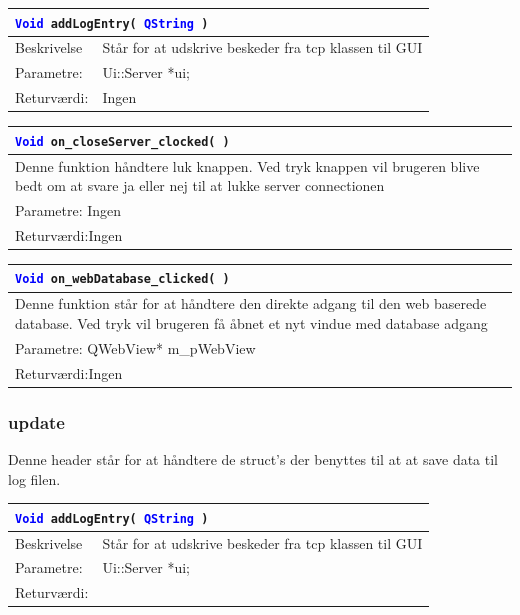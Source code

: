 \begin{table}[H]
\begin{tabular}{l p{12.5cm}}
\multicolumn{2}{l}{\texttt{\textcolor{blue}{Void} addLogEntry( \textcolor{blue}{QString} )}} \\
\hline
Beskrivelse & Står for at udskrive beskeder fra tcp klassen til GUI \\
Parametre: & Ui::Server *ui;\\
Returværdi:& Ingen\\
\end{tabular}
\end{table}

\begin{table}[H]
\begin{tabular}{l p{12.5cm}}
\multicolumn{2}{l}{\texttt{\textcolor{blue}{Void} on\_closeServer\_clocked( )}} \\
\hline
Denne funktion håndtere luk knappen. Ved tryk knappen vil brugeren blive bedt om at svare ja eller nej til at lukke server connectionen \\
Parametre: Ingen\\
Returværdi:Ingen\\
\end{tabular}
\end{table}

\begin{table}[H]
\begin{tabular}{l p{12.5cm}}
\multicolumn{2}{l}{\texttt{\textcolor{blue}{Void} on\_webDatabase\_clicked( )}} \\
\hline
Denne funktion står for at håndtere den direkte adgang til den web baserede database. Ved tryk vil brugeren få åbnet et nyt vindue med database adgang \\
Parametre: QWebView* m\_pWebView\\
Returværdi:Ingen\\
\end{tabular}
\end{table}

\subsubsection{update}
Denne header står for at håndtere de struct's der benyttes til at at save data til log filen. 

\begin{table}[H]
\begin{tabular}{l p{12.5cm}}
\multicolumn{2}{l}{\texttt{\textcolor{blue}{Void} addLogEntry( \textcolor{blue}{QString} )}} \\
\hline
Beskrivelse&Står for at udskrive beskeder fra tcp klassen til GUI \\
Parametre:& Ui::Server *ui;\\
Returværdi:&\\
\end{tabular}
\end{table}


